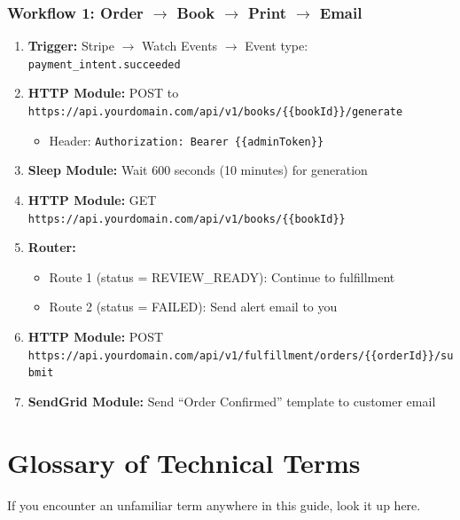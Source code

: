 \documentclass[12pt, letterpaper, oneside]{book}
\begin{document}
\subsection{Workflow 1: Order $\rightarrow$ Book $\rightarrow$ Print $\rightarrow$ Email}
\begin{enumerate}[leftmargin=2em]
  \item \textbf{Trigger:} Stripe $\rightarrow$ Watch Events $\rightarrow$ Event type: \texttt{payment\_intent.succeeded}
  \item \textbf{HTTP Module:} POST to \texttt{https://api.yourdomain.com/api/v1/books/\{\{bookId\}\}/generate}
  \begin{itemize}[leftmargin=1.5em]
    \item Header: \texttt{Authorization: Bearer \{\{adminToken\}\}}
  \end{itemize}
  \item \textbf{Sleep Module:} Wait 600 seconds (10 minutes) for generation
  \item \textbf{HTTP Module:} GET \texttt{https://api.yourdomain.com/api/v1/books/\{\{bookId\}\}}
  \item \textbf{Router:}
  \begin{itemize}[leftmargin=1.5em]
    \item Route 1 (status = REVIEW\_READY): Continue to fulfillment
    \item Route 2 (status = FAILED): Send alert email to you
  \end{itemize}
  \item \textbf{HTTP Module:} POST \texttt{https://api.yourdomain.com/api/v1/fulfillment/orders/\{\{orderId\}\}/submit}
  \item \textbf{SendGrid Module:} Send ``Order Confirmed'' template to customer email
\end{enumerate}


\chapter{Glossary of Technical Terms}

If you encounter an unfamiliar term anywhere in this guide, look it up here.
\end{document}

